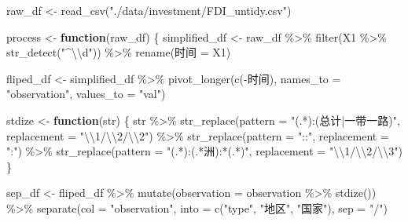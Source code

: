 \documentclass[
]{ctexart}
\newenvironment{Shaded}{\begin{snugshade}}{\end{snugshade}}
\newcommand{\AttributeTok}[1]{\textcolor[rgb]{0.77,0.63,0.00}{#1}}
\newcommand{\ControlFlowTok}[1]{\textcolor[rgb]{0.13,0.29,0.53}{\textbf{#1}}}
\newcommand{\FunctionTok}[1]{\textcolor[rgb]{0.00,0.00,0.00}{#1}}
\newcommand{\NormalTok}[1]{#1}
\newcommand{\OtherTok}[1]{\textcolor[rgb]{0.56,0.35,0.01}{#1}}
\newcommand{\SpecialCharTok}[1]{\textcolor[rgb]{0.00,0.00,0.00}{#1}}
\newcommand{\StringTok}[1]{\textcolor[rgb]{0.31,0.60,0.02}{#1}}
\begin{document}
\begin{Shaded}
\begin{Highlighting}[]
\NormalTok{raw\_df }\OtherTok{\textless{}{-}} \FunctionTok{read\_csv}\NormalTok{(}\StringTok{"./data/investment/FDI\_untidy.csv"}\NormalTok{)}

\NormalTok{process }\OtherTok{\textless{}{-}} \ControlFlowTok{function}\NormalTok{(raw\_df) \{}
\NormalTok{  simplified\_df }\OtherTok{\textless{}{-}}\NormalTok{ raw\_df }\SpecialCharTok{\%\textgreater{}\%}
    \FunctionTok{filter}\NormalTok{(X1 }\SpecialCharTok{\%\textgreater{}\%} \FunctionTok{str\_detect}\NormalTok{(}\StringTok{"\^{}}\SpecialCharTok{\textbackslash{}\textbackslash{}}\StringTok{d"}\NormalTok{)) }\SpecialCharTok{\%\textgreater{}\%}
    \FunctionTok{rename}\NormalTok{(时间 }\OtherTok{=}\NormalTok{ X1)}

\NormalTok{  fliped\_df }\OtherTok{\textless{}{-}}\NormalTok{ simplified\_df }\SpecialCharTok{\%\textgreater{}\%}
    \FunctionTok{pivot\_longer}\NormalTok{(}\FunctionTok{c}\NormalTok{(}\SpecialCharTok{{-}}\NormalTok{时间), }\AttributeTok{names\_to =} \StringTok{"observation"}\NormalTok{, }\AttributeTok{values\_to =} \StringTok{"val"}\NormalTok{)}

\NormalTok{  stdize }\OtherTok{\textless{}{-}} \ControlFlowTok{function}\NormalTok{(str) \{}
\NormalTok{    str }\SpecialCharTok{\%\textgreater{}\%}
      \FunctionTok{str\_replace}\NormalTok{(}\AttributeTok{pattern =} \StringTok{"(.*):(总计|一带一路)"}\NormalTok{, }\AttributeTok{replacement =} \StringTok{"}\SpecialCharTok{\textbackslash{}\textbackslash{}}\StringTok{1/}\SpecialCharTok{\textbackslash{}\textbackslash{}}\StringTok{2/}\SpecialCharTok{\textbackslash{}\textbackslash{}}\StringTok{2"}\NormalTok{) }\SpecialCharTok{\%\textgreater{}\%}
      \FunctionTok{str\_replace}\NormalTok{(}\AttributeTok{pattern =} \StringTok{"::"}\NormalTok{, }\AttributeTok{replacement =} \StringTok{":"}\NormalTok{) }\SpecialCharTok{\%\textgreater{}\%}
      \FunctionTok{str\_replace}\NormalTok{(}\AttributeTok{pattern =} \StringTok{"(.*):(.*洲):*(.*)"}\NormalTok{, }\AttributeTok{replacement =} \StringTok{"}\SpecialCharTok{\textbackslash{}\textbackslash{}}\StringTok{1/}\SpecialCharTok{\textbackslash{}\textbackslash{}}\StringTok{2/}\SpecialCharTok{\textbackslash{}\textbackslash{}}\StringTok{3"}\NormalTok{)}
\NormalTok{  \}}

\NormalTok{  sep\_df }\OtherTok{\textless{}{-}}\NormalTok{ fliped\_df }\SpecialCharTok{\%\textgreater{}\%}
    \FunctionTok{mutate}\NormalTok{(}\AttributeTok{observation =}\NormalTok{ observation }\SpecialCharTok{\%\textgreater{}\%} \FunctionTok{stdize}\NormalTok{()) }\SpecialCharTok{\%\textgreater{}\%}
    \FunctionTok{separate}\NormalTok{(}\AttributeTok{col =} \StringTok{"observation"}\NormalTok{, }\AttributeTok{into =} \FunctionTok{c}\NormalTok{(}\StringTok{"type"}\NormalTok{, }\StringTok{"地区"}\NormalTok{, }\StringTok{"国家"}\NormalTok{), }\AttributeTok{sep =} \StringTok{"/"}\NormalTok{)}


\end{Highlighting}
\end{Shaded}
\end{document}
